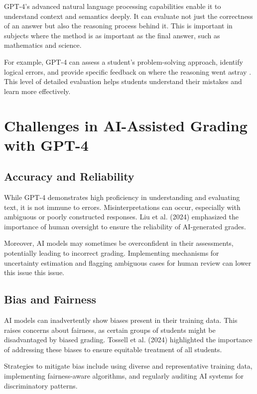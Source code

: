 \documentclass[ms,twoside,print]{nuthesis}
\begin{document}
GPT-4's advanced natural language processing capabilities enable it to understand context and semantics deeply. It can evaluate not just the correctness of an answer but also the reasoning process behind it. This is important in subjects where the method is as important as the final answer, such as mathematics and science.

For example, GPT-4 can assess a student's problem-solving approach, identify logical errors, and provide specific feedback on where the reasoning went astray \cite{Alto2023}. This level of detailed evaluation helps students understand their mistakes and learn more effectively.

\section{Challenges in AI-Assisted Grading with GPT-4}

\subsection{Accuracy and Reliability}

While GPT-4 demonstrates high proficiency in understanding and evaluating text, it is not immune to errors. Misinterpretations can occur, especially with ambiguous or poorly constructed responses. Liu et al. (2024) \cite{Liu2024} emphasized the importance of human oversight to ensure the reliability of AI-generated grades.

Moreover, AI models may sometimes be overconfident in their assessments, potentially leading to incorrect grading. Implementing mechanisms for uncertainty estimation and flagging ambiguous cases for human review can lower this issue this issue.

\subsection{Bias and Fairness}

AI models can inadvertently show biases present in their training data. This raises concerns about fairness, as certain groups of students might be disadvantaged by biased grading. Tossell et al. (2024) \cite{Tossell2024} highlighted the importance of addressing these biases to ensure equitable treatment of all students.

Strategies to mitigate bias include using diverse and representative training data, implementing fairness-aware algorithms, and regularly auditing AI systems for discriminatory patterns.
\end{document}
